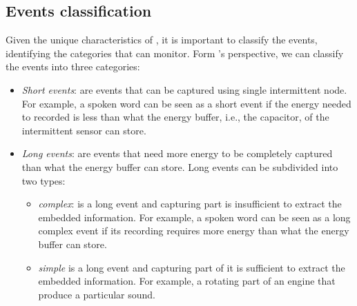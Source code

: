 \subsection{Events classification}
Given the unique characteristics of \sys, it is important to classify the events, identifying the categories that \sys can monitor. Form \sys's perspective, we can classify the events into three categories:
\begin{itemize}
%
\item \textit{Short events}: are events that can be captured using single intermittent node. 
For example, a spoken word can be seen as a short event if the energy needed to recorded is less than what the energy buffer, i.e., the capacitor, of the intermittent sensor can store.
%
\item \textit{Long events}: are events that need more energy to be completely captured than what the energy buffer can store. Long events can be subdivided into two types: 
\begin{itemize}
	\item \textit{complex}: is a long event and capturing part is insufficient to extract the embedded information.  For example, a spoken word can be seen as a long complex event if its recording requires more energy than what the energy buffer can store.

	\item \textit{simple} is a long event and capturing part of it is sufficient to extract the embedded information. For example, a rotating part of an engine that produce a particular sound. 
\end{itemize}
%

\end{itemize}


